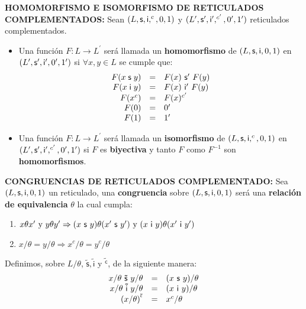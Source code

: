   \vspace{3mm}
  \PN \textbf{HOMOMORFISMO E ISOMORFISMO DE RETICULADOS COMPLEMENTADOS:} Sean $(L, \mathsf{s}, \mathsf{i}, ^{c}, 0, 1)$ y
  $(L^{\prime}, \mathsf{s}^{\prime}, \mathsf{i}^{\prime}, ^{c^{\prime}}, 0^{\prime}, 1^{\prime})$ reticulados complementados.
  \begin{itemize}
    \item Una función $F: L \rightarrow L^{\prime}$ será llamada un \textbf{homomorfismo} de $(L, \mathsf{s}, \mathsf{i}, 0, 1)$ en
      $(L^{\prime}, \mathsf{s}^{\prime}, \mathsf{i}^{\prime}, 0^{\prime}, 1^{\prime})$ si $\forall x, y \in L$ se cumple que:
      \[
        \begin{array}{rcl}
          F(x \mathsf{\;s\;} y) &=& F(x) \ \mathsf{s}^{\prime} \ F(y) \\
          F(x \mathsf{\;i\;} y) &=& F(x) \ \mathsf{i}^{\prime} \ F(y) \\
          F(x^{c}) &=& F(x)^{c^{\prime}} \\
          F(0) &=& 0^{\prime} \\
          F(1) &=& 1^{\prime}
        \end{array}
      \]
    \item Una función $F: L \rightarrow L^{\prime}$ será llamada un \textbf{isomorfismo} de $(L, \mathsf{s}, \mathsf{i}, ^{c}, 0, 1)$
      en $(L^{\prime}, \mathsf{s}^{\prime}, \mathsf{i}^{\prime}, ^{c^{\prime}}, 0^{\prime}, 1^{\prime})$ si $F$ es \textbf{biyectiva}
      y tanto $F$ como $F^{-1}$ son \textbf{homomorfismos}.
  \end{itemize}

  \vspace{3mm}
  \PN \textbf{CONGRUENCIAS DE RETICULADOS COMPLEMENTADO:} Sea $(L, \mathsf{s}, \mathsf{i}, 0, 1)$ un reticulado, una \textbf{congruencia}
  sobre $(L, \mathsf{s}, \mathsf{i}, 0, 1)$ será una \textbf{relación de equivalencia} $\theta$ la cual cumpla:
  \begin{enumerate}
    \item $x \theta x^{\prime} \text{ y } y \theta y^{\prime} \Rightarrow (x \ \SU \ y) \theta (x^{\prime} \ \SU \
      y^{\prime}) \text{ y } (x \ \IN \ y) \theta (x^{\prime} \ \IN \ y^{\prime})$
    \item $x/\theta = y/\theta \Rightarrow x^{c}/\theta = y^{c}/\theta$
  \end{enumerate}

  \PN Definimos, sobre $L/\theta$, $\mathsf{\tilde{s}}, \mathsf{\tilde{i}}$ y $\mathsf{\tilde{^{c}}}$, de la siguiente
  manera:
  \[
    \begin{array}{rcl}
      x/\theta \ \mathsf{\tilde{s}} \ y/\theta &=& (x \ \SU \ y)/\theta \\
      x/\theta \ \mathsf{\tilde{i}} \ y/\theta &=& (x \ \IN \ y)/\theta \\
      (x/\theta)^{\mathsf{\tilde{^{c}}}} &=& x^{c}/\theta \\
    \end{array}
  \]

